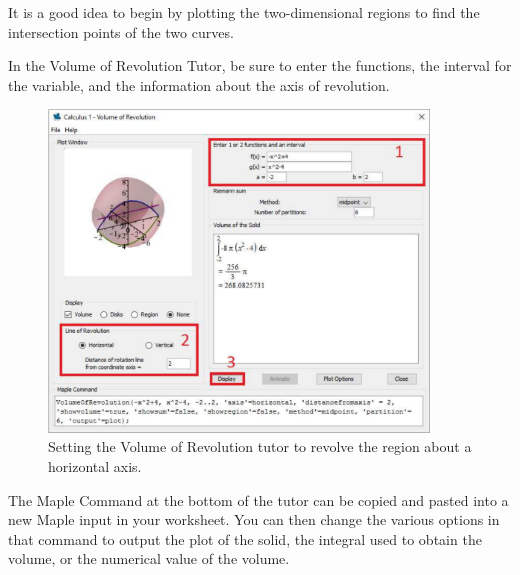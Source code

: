 It is a good idea to begin by plotting the two-dimensional regions to find the intersection points of the two curves.

\begin{maplegroup}
\begin{mapleinput}
\end{mapleinput}
\mapleresult
{}
\end{maplegroup}

In the Volume of Revolution Tutor, be sure to enter the functions, the interval for the variable, and the information about the axis of revolution.

\begin{figure}
\caption{Setting the Volume of Revolution tutor to revolve the region about a horizontal axis.}
\centering
\includegraphics[width=0.9\textwidth]{tutorials/figures/VoRTutorQ1-1-eps-converted-to.pdf}
\end{figure}


The Maple Command at the bottom of the tutor can be copied and pasted into a new Maple input in your worksheet. You can then change the various options in that command to output the plot of the solid, the integral used to obtain the volume, or the numerical value of the volume.

